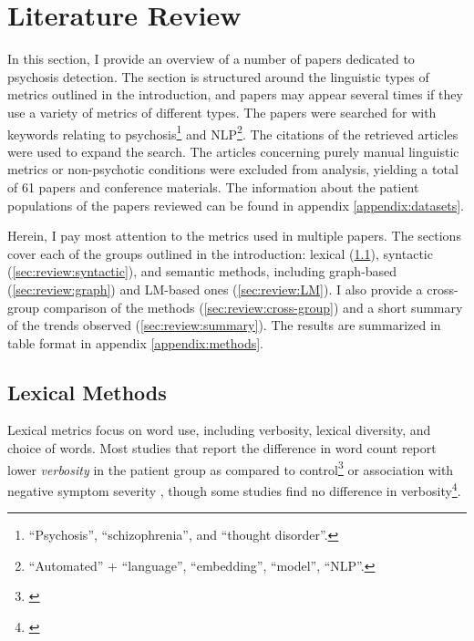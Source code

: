 
\chapter{Literature Review} %
\label{chap:2:review} 

In this section, I provide an overview of a number of papers dedicated to psychosis detection. The section is structured around the linguistic types of metrics outlined in the introduction, and papers may appear several times if they use a variety of metrics of different types. The papers were searched for with keywords relating to psychosis\footnote{``Psychosis'', ``schizophrenia'', and ``thought disorder''.} and NLP\footnote{``Automated'' + ``language'', ``embedding'',  ``model'', ``NLP''.}. The citations of the retrieved articles were used to expand the search. The articles concerning purely manual linguistic metrics or non-psychotic conditions were excluded from analysis, yielding a total of 61 papers and conference materials. The information about the patient populations of the papers reviewed can be found in appendix \ref{appendix:datasets}.

Herein, I pay most attention to the metrics used in multiple papers. The sections cover each of the groups outlined in the introduction: lexical (\ref{sec:review:lexical}), syntactic (\ref{sec:review:syntactic}), and semantic methods, including graph-based (\ref{sec:review:graph}) and LM-based ones (\ref{sec:review:LM}). I also provide a cross-group comparison of the methods (\ref{sec:review:cross-group}) and a short summary of the trends observed (\ref{sec:review:summary}). The results are summarized in table format in appendix \ref{appendix:methods}.


\section{Lexical Methods}
\label{sec:review:lexical}

Lexical metrics focus on word use, including verbosity, lexical diversity, and choice of words. Most studies that report the difference in word count report lower \textit{verbosity} in the patient group as compared to control\footnote{\cite{mota2014graph, iter2018automatic, willits2018evidence, dore2019quantification, just2019coherence, just2020modeling, panicheva2020corpus, morgan2021natural, spencer2021lower, voppel2021quantified, liang2022widespread, parola2022speech}} or association with negative symptom severity \citep{morgan2021natural, minor2023automated}, though some studies find no difference in verbosity\footnote{\cite{mota2012speech, gupta2018automated, tang2021natural, alonso2022language, alonso2022progressive, schneider2023syntactic, nettekoven2023semantic}}. 

